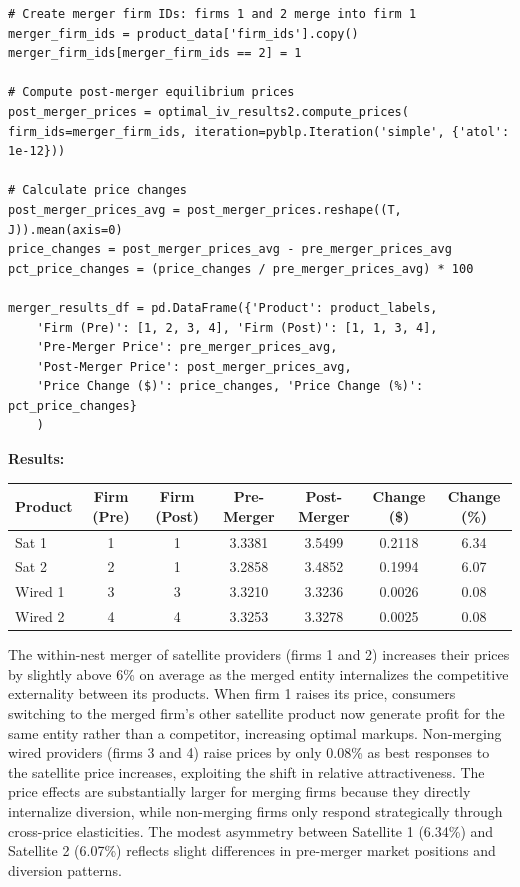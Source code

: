 \documentclass[english,11pt]{article}
\begin{document}
\begin{enumerate}
\begin{verbatim}
# Create merger firm IDs: firms 1 and 2 merge into firm 1
merger_firm_ids = product_data['firm_ids'].copy()
merger_firm_ids[merger_firm_ids == 2] = 1

# Compute post-merger equilibrium prices
post_merger_prices = optimal_iv_results2.compute_prices(
firm_ids=merger_firm_ids, iteration=pyblp.Iteration('simple', {'atol': 1e-12}))

# Calculate price changes
post_merger_prices_avg = post_merger_prices.reshape((T, J)).mean(axis=0)
price_changes = post_merger_prices_avg - pre_merger_prices_avg
pct_price_changes = (price_changes / pre_merger_prices_avg) * 100

merger_results_df = pd.DataFrame({'Product': product_labels,
    'Firm (Pre)': [1, 2, 3, 4], 'Firm (Post)': [1, 1, 3, 4],
    'Pre-Merger Price': pre_merger_prices_avg,
    'Post-Merger Price': post_merger_prices_avg,
    'Price Change ($)': price_changes, 'Price Change (%)': pct_price_changes}
    )
\end{verbatim}

\textbf{Results:}

\begin{center}
\begin{tabular}{lcccccc}
\hline
Product & Firm (Pre) & Firm (Post) & Pre-Merger & Post-Merger & Change (\$) & Change (\%) \\
\hline
Sat 1 & 1 & 1 & 3.3381 & 3.5499 & 0.2118 & 6.34 \\
Sat 2 & 2 & 1 & 3.2858 & 3.4852 & 0.1994 & 6.07 \\
Wired 1 & 3 & 3 & 3.3210 & 3.3236 & 0.0026 & 0.08 \\
Wired 2 & 4 & 4 & 3.3253 & 3.3278 & 0.0025 & 0.08 \\
\hline
\end{tabular}
\end{center}

The within-nest merger of satellite providers (firms 1 and 2) increases their prices by slightly above 6\% on average as the merged entity internalizes the competitive externality between its products. When firm 1 raises its price, consumers switching to the merged firm's other satellite product now generate profit for the same entity rather than a competitor, increasing optimal markups. Non-merging wired providers (firms 3 and 4) raise prices by only 0.08\% as best responses to the satellite price increases, exploiting the shift in relative attractiveness. The price effects are substantially larger for merging firms because they directly internalize diversion, while non-merging firms only respond strategically through cross-price elasticities. The modest asymmetry between Satellite 1 (6.34\%) and Satellite 2 (6.07\%) reflects slight differences in pre-merger market positions and diversion patterns.


\end{enumerate}
\end{document}
